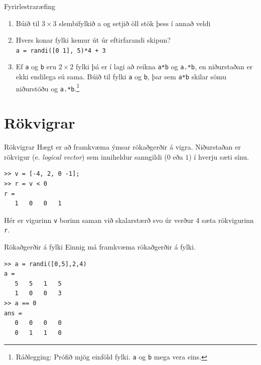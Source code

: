\documentclass[handout]{beamer}
\begin{document}
\begin{frame}{Fyrirlestraræfing}
\begin{enumerate}
 \item Búið til $3 \times 3$ slembifylkið a og setjið öll stök þess í annað veldi
 \item Hvers konar fylki kemur út úr eftirfarandi skipun? \\ \texttt{a = randi([0 1], 5)*4 + 3} \\
 \item Ef \texttt{a} og \texttt{b} eru $2 \times 2$ fylki þá er í lagi að reikna \texttt{a*b} og \texttt{a.*b}, en niðurstaðan er ekki endilega sú sama.  Búið til fylki \texttt{a} og \texttt{b}, þar sem \texttt{a*b} skilar sömu niðurstöðu og \texttt{a.*b}.\footnote{Ráðlegging: Prófið mjög einföld fylki. \texttt{a} og \texttt{b} mega vera eins.}
\end{enumerate}
\end{frame}

\section{Rökvigrar}

\begin{frame}[fragile]{Rökvigrar}
\vspace{\baselineskip}
Hægt er að framkvæma ýmsar rökaðgerðir á vigra. Niðurstaðan er rökvigur (e. \emph{logical vector}) sem inniheldur sanngildi ($0$ eða $1$) í hverju sæti sínu.
\begin{verbatim}
>> v = [-4, 2, 0 -1];
>> r = v < 0
r =
   1   0   0   1
\end{verbatim}
Hér er vigurinn \texttt{v} borinn saman við skalarstærð svo úr verður 4 sæta rökvigurinn \texttt{r}.
\end{frame}

\begin{frame}[fragile]{Rökaðgerðir á fylki}
\vspace{\baselineskip}
Einnig má framkvæma rökaðgerðir á fylki.
\begin{verbatim}
>> a = randi([0,5],2,4)
a =
   5   5   1   5
   1   0   0   3
>> a == 0
ans =
   0   0   0   0
   0   1   1   0
\end{verbatim}
\end{frame}
\end{document}
